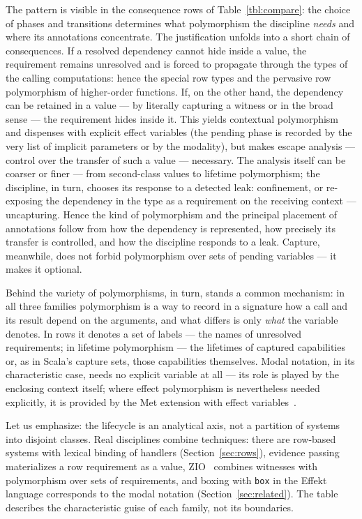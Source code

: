 \documentclass[11pt]{article}
\begin{document}
The pattern is visible in the consequence rows of Table~\ref{tbl:compare}: the choice of phases
and transitions determines what polymorphism the discipline \emph{needs} and where its
annotations concentrate. The justification unfolds into a short chain of consequences. If a
resolved dependency cannot hide inside a value, the requirement remains unresolved and is forced
to propagate through the types of the calling computations: hence the special row types and the
pervasive row polymorphism of higher-order functions. If, on the other hand, the dependency can
be retained in a value --- by literally capturing a witness or in the broad sense --- the
requirement hides inside it. This yields contextual polymorphism and dispenses with explicit
effect variables (the pending phase is recorded by the very list of implicit parameters or by
the modality), but makes escape analysis --- control over the transfer of such a value ---
necessary. The analysis itself can be coarser or finer --- from second-class values to lifetime
polymorphism; the discipline, in turn, chooses its response to a detected leak: confinement, or
re-exposing the dependency in the type as a requirement on the receiving context ---
uncapturing. Hence the kind of polymorphism and the principal placement of annotations follow
from how the dependency is represented, how precisely its transfer is controlled, and how the
discipline responds to a leak. Capture, meanwhile, does not forbid polymorphism over sets of
pending variables --- it makes it optional.

Behind the variety of polymorphisms, in turn, stands a common mechanism: in all three families
polymorphism is a way to record in a signature how a call and its result depend on the
arguments, and what differs is only \emph{what} the variable denotes. In rows it denotes a set
of labels --- the names of unresolved requirements; in lifetime polymorphism --- the lifetimes
of captured capabilities or, as in Scala's capture sets, those capabilities themselves. Modal
notation, in its characteristic case, needs no explicit variable at all --- its role is played
by the enclosing context itself; where effect polymorphism is nevertheless needed explicitly, it
is provided by the Met extension with effect variables~\cite{tang2025modal}.

Let us emphasize: the lifecycle is an analytical axis, not a partition of systems into disjoint
classes. Real disciplines combine techniques: there are row-based systems with lexical binding
of handlers (Section~\ref{sec:rows}), evidence passing materializes a row requirement as a
value, ZIO~\cite{zio-lib} combines witnesses with polymorphism over sets of requirements, and
boxing with \texttt{box} in the Effekt language corresponds to the modal notation
(Section~\ref{sec:related}). The table describes the characteristic guise of each family, not
its boundaries.
\end{document}
